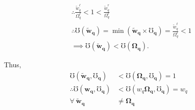 \documentclass[hidelinks, nonatbib]{elsarticle}
\begin{document}
\begin{enumerate}
\begin{align}
        &\therefore
        \frac{
            \tilde{w}_{q}^{\ell}
        }{
            \Omega_{q}^{\ell}
        }
        < 
        1
        < 
        \frac{
            \tilde{w}_{q}^{r}
        }{
            \Omega_{q}^{r}
        }
        \\
        &\therefore
        \mho(\boldsymbol{\tilde{w}_q})
        = 
        \min(
            \boldsymbol{\tilde{w}_q}
            \times
            \boldsymbol{\mho_q}
        )
        =
        \frac{
            \tilde{w}_{q}^{\ell}
        }{
            \Omega_{q}^{\ell}
        }
        < 
        1
        \\
        &\implies
        \mho(\boldsymbol{\tilde{w}_q})
        <
        \mho(\boldsymbol{\Omega_q})
        .
    \end{align}

    Thus, 
    \begin{align}
        \mho(
            \boldsymbol{\tilde{w}_{q}},
            \boldsymbol{\mho_q}
        ) 
        &< 
        \mho(
            \boldsymbol{\Omega_{q}},
            \boldsymbol{\mho_q}
        ) 
        = 1
        \\
        \therefore
        \mho(
            \boldsymbol{w_{q}},
            \boldsymbol{\mho_q}
        )
        &< 
        \mho(
            w_{q}
            \boldsymbol{\Omega_{q}},
            \boldsymbol{\mho_q}
        ) 
        = w_q
        \\
        \forall
        \
        \boldsymbol{\tilde{w}_{q}}
        &\neq
        \boldsymbol{\Omega_{q}}
    \end{align}


\end{enumerate}
\end{document}

